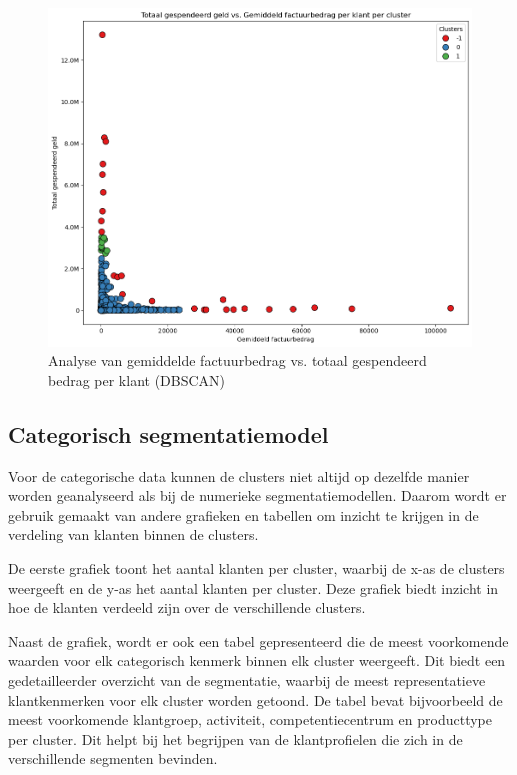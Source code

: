 \begin{figure}[H]
    \centering
    \includegraphics[width=0.8\linewidth]{images/DBSCAN/Analyse2DBSCAN}
    \caption{Analyse van gemiddelde factuurbedrag vs. totaal gespendeerd bedrag per klant (DBSCAN)}
    \label{fig:Analyse_DBSCAN}
\end{figure}


\subsection*{Categorisch segmentatiemodel}

Voor de categorische data kunnen de clusters niet altijd op dezelfde manier worden geanalyseerd als bij de numerieke segmentatiemodellen. Daarom wordt er gebruik gemaakt van andere grafieken en tabellen om inzicht te krijgen in de verdeling van klanten binnen de clusters.

\vspace{1em}

De eerste grafiek toont het aantal klanten per cluster, waarbij de x-as de clusters weergeeft en de y-as het aantal klanten per cluster. Deze grafiek biedt inzicht in hoe de klanten verdeeld zijn over de verschillende clusters.

\vspace{1em}

Naast de grafiek, wordt er ook een tabel gepresenteerd die de meest voorkomende waarden voor elk categorisch kenmerk binnen elk cluster weergeeft. Dit biedt een gedetailleerder overzicht van de segmentatie, waarbij de meest representatieve klantkenmerken voor elk cluster worden getoond. De tabel bevat bijvoorbeeld de meest voorkomende klantgroep, activiteit, competentiecentrum en producttype per cluster. Dit helpt bij het begrijpen van de klantprofielen die zich in de verschillende segmenten bevinden.



